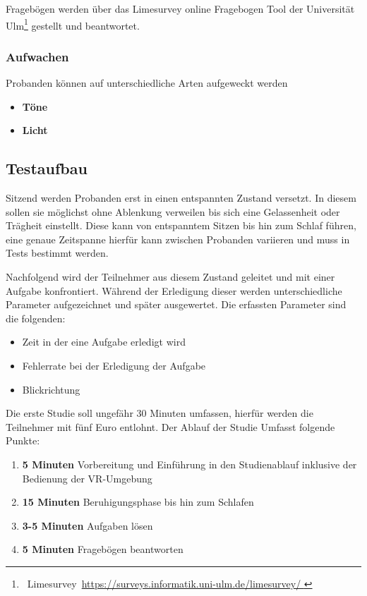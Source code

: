 \documentclass[a4paper, 11pt]{article}
\begin{document}
Fragebögen werden über das Limesurvey online Fragebogen Tool der Universität Ulm\footnote{~Limesurvey~\url{https://surveys.informatik.uni-ulm.de/limesurvey/
}} gestellt und beantwortet. 

\subsubsection*{Aufwachen}
Probanden können auf unterschiedliche Arten aufgeweckt werden~\cite{jewett1999time, ferrara2000sleep}
\begin{itemize}
    \item \textbf{Töne}
    \item \textbf{Licht}
\end{itemize}

\subsection{Testaufbau}
Sitzend werden Probanden erst in einen entspannten Zustand versetzt. In diesem sollen sie möglichst ohne Ablenkung verweilen bis sich eine Gelassenheit oder Trägheit einstellt. Diese kann von entspanntem Sitzen bis hin zum Schlaf führen, eine genaue Zeitspanne hierfür kann zwischen Probanden variieren und muss in Tests bestimmt werden.

Nachfolgend wird der Teilnehmer aus diesem Zustand geleitet und mit einer Aufgabe konfrontiert. Während der Erledigung dieser werden unterschiedliche Parameter aufgezeichnet und später ausgewertet. Die erfassten Parameter sind die folgenden:

\begin{itemize}
    \item Zeit in der eine Aufgabe erledigt wird
    \item Fehlerrate bei der Erledigung der Aufgabe
    \item Blickrichtung
\end{itemize}

Die erste Studie soll ungefähr 30 Minuten umfassen, hierfür werden die Teilnehmer mit fünf Euro entlohnt. Der Ablauf der Studie Umfasst folgende Punkte:

\begin{enumerate}
    \item \textbf{5 Minuten} Vorbereitung und Einführung in den Studienablauf inklusive der Bedienung der VR-Umgebung
    \item \textbf{15 Minuten} Beruhigungsphase bis hin zum Schlafen
    \item \textbf{3-5 Minuten} Aufgaben lösen
    \item \textbf{5 Minuten} Fragebögen beantworten
\end{enumerate}
\end{document}
